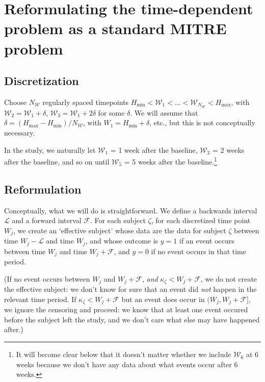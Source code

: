 \documentclass[12pt]{article}
\begin{document}
\section{Reformulating the time-dependent problem as a standard MITRE problem}

\subsection{Discretization} 
Choose $N_\mathcal W$ regularly spaced timepoints $H_\text{min} <
\mathcal W_1 < \ldots < \mathcal W_{N_\mathcal W} < H_\text{max}$,
with $\mathcal W_{2} = \mathcal W_1 + \delta$, $\mathcal W_{3} =
\mathcal W_{1} + 2\delta$ for some $\delta$.  We will assume that
$\delta = (H_\text{max} - H_\text{min})/N_\mathcal W $, with $W_1 =
H_\text{min} + \delta$, etc., but this is not conceptually necessary.

In the  study, we naturally let $\mathcal W_1$ = 1 week
after the baseline, $\mathcal W_2$ = 2 weeks after the baseline, and
so on until $\mathcal W_5$ = 5 weeks after the baseline.\footnote{It
  will become clear below that it doesn't matter whether we include
  $\mathcal W_6$ at 6 weeks because we don't have any data about what
  events occur after 6 weeks.}

\subsection{Reformulation}

Conceptually, what we will do is straightforward. We define a
backwards interval $\mathcal L$ and a forward interval $\mathcal F$.
For each subject $\zeta$, for each discretized time point $W_j$, we
create an `effective subject' whose data are the data for subject
$\zeta$ between time $W_j - \mathcal L$ and time $W_j$, and whose
outcome is $y=1$ if an event occurs between time $W_j$ and time $W_j +
\mathcal F$, and $y=0$ if no event occurs in that time period.

(If no event occurs between $W_j$ and $W_j + \mathcal F$, \textit{and}
$\kappa_\zeta < W_j + \mathcal F$, we do not create the effective
subject: we don't know for sure that an event did \textit{not} happen
in the relevant time period. If $\kappa_\zeta < W_j + \mathcal F$ but
an event does occur in $(W_j, W_j + \mathcal F]$, we ignore the
  censoring and proceed: we know that at least one event occured
  before the subject left the study, and we don't care what else may
  have happened after.)
\end{document}
